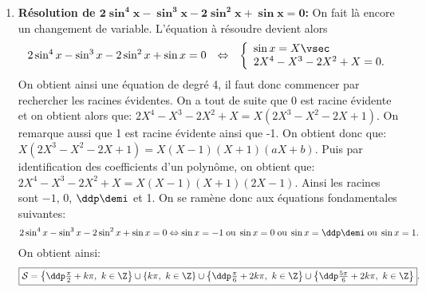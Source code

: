 \begin{correction}
\begin{enumerate}
\begin{center}
\end{center}
\item  \textbf{R\'esolution de $\mathbf{ 2\sin^4{x}-\sin^3{x}-2\sin^2{x}+\sin{x}=0 }$:}
On fait l\`{a} encore un changement de variable. L'\'equation \`a r\'esoudre devient alors
$$\begin{array}{lll}
2\sin^4{x}-\sin^3{x}-2\sin^2{x}+\sin{x}=0
&\Leftrightarrow & 
\left\lbrace\begin{array}{l}
\sin{x}=X\vsec\\
2X^4-X^3-2X^2+X=0.
\end{array}\right.\end{array}$$
On obtient ainsi une \'equation de degr\'e 4, il faut donc commencer par rechercher les racines \'evidentes. On a tout de suite que 0 est racine \'evidente et on obtient alors que: $2X^4-X^3-2X^2+X=X(2X^3-X^2-2X+1)$. On remarque aussi que 1 est racine \'evidente ainsi que -1. On obtient donc que: $X(2X^3-X^2-2X+1)=X(X-1)(X+1)(aX+b)$. Puis par identification des coefficients d'un polyn\^{o}me, on obtient que: $2X^4-X^3-2X^2+X=X(X-1)(X+1)(2X-1)$. Ainsi les racines sont $-1$, $0$, $\ddp\demi$ et 1. On se ram\`{e}ne donc aux \'equations fondamentales suivantes:
$$
2\sin^4{x}-\sin^3{x}-2\sin^2{x}+\sin{x}=0\Leftrightarrow  
\sin{x}=-1 \; \hbox{ou} \; \sin{x}=0 \; \hbox{ou} \; \sin{x}=\ddp\demi \; \hbox{ou}\; \sin{x}=1.
$$
On obtient ainsi:
$$\fbox{$\mathcal{S}=\left\lbrace \ddp\frac{\pi}{2}+k\pi,\ k\in\Z\right\rbrace\cup\left\lbrace k\pi,\ k\in\Z\right\rbrace\cup\left\lbrace\ddp\frac{\pi}{6}+2k\pi,\ k\in\Z\right\rbrace\cup\left\lbrace\ddp\frac{5\pi}{6}+2k\pi,\ k\in\Z\right\rbrace$}.$$
\begin{center}
\end{center}
\end{enumerate}
\end{correction}
